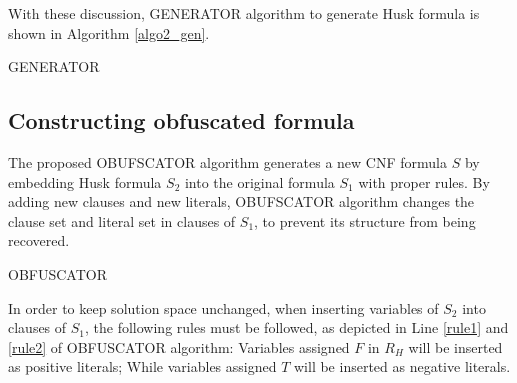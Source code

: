 \documentclass[runningheads,a4paper]{llncs}
\begin{document}
With these discussion,
GENERATOR algorithm to generate Husk formula is shown in Algorithm \ref{algo2_gen}.

\begin{algorithm}[b]
\SetAlgoLined
{}
\caption{GENERATOR}
\label{algo2_gen}
\end{algorithm}


\subsection{Constructing obfuscated formula}\label{obfuscating}

The proposed OBUFSCATOR algorithm generates a new CNF formula $S$
by embedding Husk formula $S_2$ into the original formula $S_1$ with proper rules.
By adding new clauses and new literals, 
OBUFSCATOR algorithm changes the clause set and literal set in clauses of $S_1$,
to prevent its structure from being recovered.


\begin{algorithm}[t]
\caption{OBFUSCATOR}
\label{algo_obs}
\end{algorithm}

In order to keep solution space unchanged, 
when inserting variables of $S_2$ into clauses of $S_1$, 
the following rules must be followed, 
as depicted in Line \ref{rule1} and \ref{rule2} of OBFUSCATOR algorithm:
Variables assigned $F$ in $R_H$ will be inserted as positive literals;
While variables assigned $T$ will be inserted as negative literals. 
\end{document}
